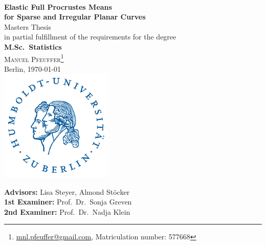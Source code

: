 \documentclass[a4paper,12pt,english,headings=small]{scrreprt}
\theoremstyle{plain}
\theoremstyle{definition}
\theoremstyle{remark}
\theoremstyle{plain}
\begin{document}

\begin{titlepage}
  \begin{center}
  \\
  \vspace{1.66cm}
    {\LARGE\sffamily\textbf{Elastic Full Procrustes Means\vspace{0.5cm}\\
    for Sparse and Irregular Planar Curves}}
  \vspace{1.2cm}\\
    {\large Masters Thesis}\\
    in partial fulfillment of the requirements for the degree\\
    \textbf{M.Sc.\ Statistics}
  \vspace{1.2cm}\\
  \textsc{\large Manuel Pfeuffer\footnote{\url{mnl.pfeuffer@gmail.com}, Matriculation number: 577668}}\\
  Berlin, \today
  \vspace{2.0cm}\\
    \includegraphics[width=0.4\textwidth]{graphics/hulogo.pdf}
  \vspace{0.5cm}\\

  \vfill
  \end{center}

  \noindent \textbf{Advisors:} Lisa Steyer, Almond Stöcker\\
  \noindent \textbf{1st Examiner:} Prof.\ Dr.\ Sonja Greven\\
  \noindent \textbf{2nd Examiner:} Prof.\ Dr.\ Nadja Klein
  \vspace{0.5em}

\end{titlepage}

\tableofcontents
\end{document}
